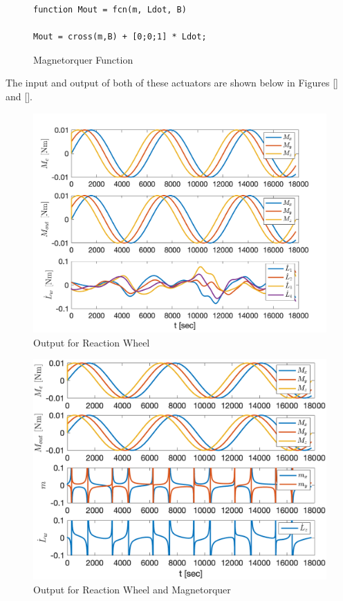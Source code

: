 \begin{figure}[H]
    \centering
    \captionsetup{ justification = centering}
    \begin{lstlisting}
function Mout = fcn(m, Ldot, B)

Mout = cross(m,B) + [0;0;1] * Ldot;
    \end{lstlisting}
    \caption{Magnetorquer Function}
    \label{fig:mtCode}
\end{figure}

The input and output of both of these actuators are shown below in Figures \ref{} and \ref{}.

\begin{figure}[H]
    \centering
    \captionsetup{ justification = centering }
    \includegraphics[width = 15cm]{Images/PS9/reaction_wheel_model_output.png}
    \caption{Output for Reaction Wheel}
    \label{fig:rwOutput}
\end{figure}

\begin{figure}[H]
    \centering
    \captionsetup{ justification = centering }
    \includegraphics[width = 15cm]{Images/PS9/simple_magnetorquer_plus_wheel_model_output.png}
    \caption{Output for Reaction Wheel and Magnetorquer}
    \label{fig:mtOutput}
\end{figure}

